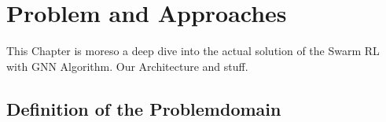 
\chapter{Problem and Approaches}
\label{ch:ProblemApproaches}

This Chapter is moreso a deep dive into the actual solution of the Swarm RL with GNN Algorithm. Our Architecture and stuff.
\section{Definition of the Problemdomain}

